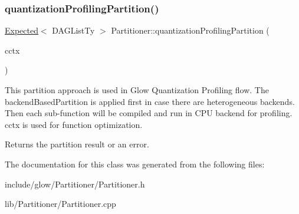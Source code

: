 \subsubsection{\texorpdfstring{quantization\+Profiling\+Partition()}{quantizationProfilingPartition()}}
{\footnotesize\ttfamily \hyperlink{classglow_1_1detail_1_1_glow_expected}{Expected}$<$ D\+A\+G\+List\+Ty $>$ Partitioner\+::quantization\+Profiling\+Partition (\begin{DoxyParamCaption}\item[{\hyperlink{structglow_1_1_compilation_context}{Compilation\+Context} \&}]{cctx }\end{DoxyParamCaption})}

This partition approach is used in Glow Quantization Profiling flow. The backend\+Based\+Partition is applied first in case there are heterogeneous backends. Then each sub-\/function will be compiled and run in C\+PU backend for profiling. {\ttfamily cctx} is used for function optimization. \begin{DoxyReturn}{Returns}
the partition result or an error. 
\end{DoxyReturn}


The documentation for this class was generated from the following files\+:\begin{DoxyCompactItemize}
\item 
include/glow/\+Partitioner/Partitioner.\+h\item 
lib/\+Partitioner/Partitioner.\+cpp\end{DoxyCompactItemize}
